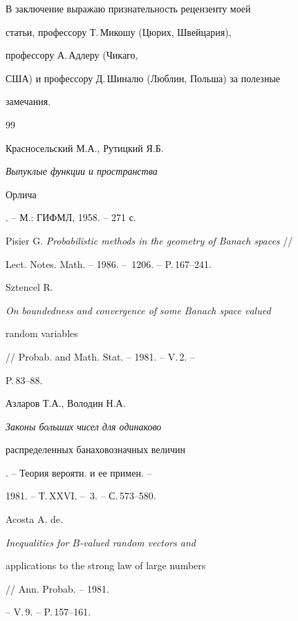 В заключение выражаю признательность рецензенту моей


статьи, профессору Т.\,Микошу (Цюрих, Швейцария),


профессору А.\,Адлеру (Чикаго,


США) и профессору Д.\,Шиналю (Люблин, Польша) за полезные


замечания.





\begin{thebibliography}{99} 


 




Красносельский М.А., Рутицкий Я.Б. {\em Выпуклые функции и пространства 


Орлича}. -- М.: ГИФМЛ, 1958. -- 271 с. 


 




Pisier G. {\em Probabilistic methods in the geometry of Banach spaces} // 


Lect. Notes. Math. -- 1986. -- \No\,1206. -- P.\,167--241. 


 




Sztencel R. {\em On boundedness and convergence of some Banach space valued 


random variables} // Probab. and Math. Stat. -- 1981. -- V.\,2. -- 


P.\,83--88. 


 




Азларов Т.А., Володин Н.А. {\em Законы больших чисел для одинаково 


распределенных банаховозначных величин}. -- Теория вероятн. и ее примен. -- 


1981. -- Т.\,XXVI. -- \No\,3. -- С.\,573--580. 


 




Acosta A. de. {\em Inequalities for $B$-valued random vectors and 


applications to the strong law of large numbers} // Ann. Probab. -- 1981. 


-- V.\,9. -- P.\,157--161. 



\end{thebibliography}
